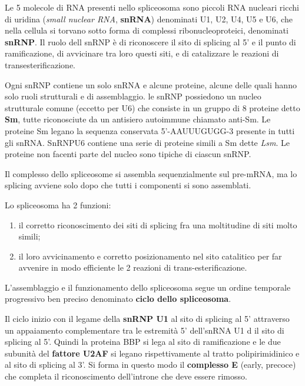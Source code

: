 \documentclass[]{article}
\begin{document}
Le 5 molecole di RNA presenti nello spliceosoma sono piccoli RNA
nucleari ricchi di uridina (\emph{small nuclear RNA}, \textbf{snRNA})
denominati U1, U2, U4, U5 e U6, che nella cellula si torvano sotto forma
di complessi ribonucleoproteici, denominati \textbf{snRNP}. Il ruolo
dell snRNP è di riconoscere il sito di splicing al 5' e il punto di
ramificazione, di avvicinare tra loro questi siti, e di catalizzare le
reazioni di transesterificazione.

Ogni snRNP contiene un solo snRNA e alcune proteine, alcune delle quali
hanno solo ruoli strutturali e di assemblaggio. le snRNP possiedono un
nucleo strutturale comune (eccetto per U6) che consiste in un gruppo di
8 proteine detto \textbf{Sm}, tutte riconosciute da un antisiero
autoimmune chiamato anti-Sm. Le proteine Sm legano la sequenza
conservata 5'-AAUUUGUGG-3 presente in tutti gli snRNA. SnRNPU6 contiene
una serie di proteine simili a Sm dette \emph{Lsm}. Le proteine non
facenti parte del nucleo sono tipiche di ciascun snRNP.

Il complesso dello spliceosome si assembla sequenzialmente sul pre-mRNA,
ma lo splicing avviene solo dopo che tutti i componenti si sono
assemblati.

Lo spliceosoma ha 2 funzioni:

\begin{enumerate}
\def\labelenumi{\arabic{enumi}.}
\itemsep1pt\parskip0pt
\item
  il corretto riconoscimento dei siti di splicing fra una moltitudine di
  siti molto simili;
\item
  il loro avvicinamento e corretto posizionamento nel sito catalitico
  per far avvenire in modo efficiente le 2 reazioni di
  trans-esterificazione.
\end{enumerate}

L'assemblaggio e il funzionamento dello spliceosoma segue un ordine
temporale progressivo ben preciso denominato \textbf{ciclo dello
spliceosoma}.

Il ciclo inizio con il legame della \textbf{snRNP U1} al sito di
splicing al 5' attraverso un appaiamento complementare tra le estremità
5' dell'snRNA U1 d il sito di splicing al 5'. Quindi la proteina BBP si
lega al sito di ramificazione e le due subunità del \textbf{fattore
U2AF} si legano rispettivamente al tratto polipirimidinico e al sito di
splicing al 3'. Si forma in questo modo il \textbf{complesso E} (early,
precoce) che completa il riconoscimento dell'introne che deve essere
rimosso.
\end{document}
